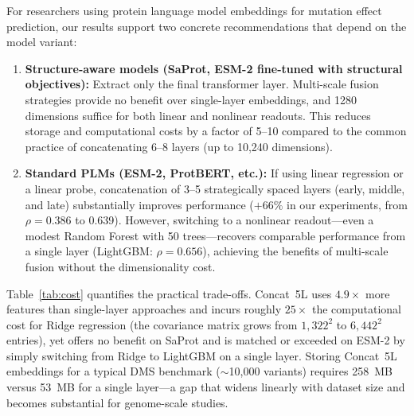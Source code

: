\documentclass[11pt,a4paper]{article}
\begin{document}
For researchers using protein language model embeddings for mutation effect
prediction, our results support two concrete recommendations that depend on
the model variant:

\begin{enumerate}
    \item \textbf{Structure-aware models (SaProt, ESM-2 fine-tuned with structural
    objectives):} Extract only the final transformer layer. Multi-scale fusion
    strategies provide no benefit over single-layer embeddings, and 1280
    dimensions suffice for both linear and nonlinear readouts. This reduces
    storage and computational costs by a factor of 5--10 compared to the common
    practice of concatenating 6--8 layers (up to 10,240 dimensions).

    \item \textbf{Standard PLMs (ESM-2, ProtBERT, etc.):} If using linear
    regression or a linear probe, concatenation of 3--5 strategically spaced
    layers (early, middle, and late) substantially improves performance
    ($+66\%$ in our experiments, from $\rho = 0.386$ to 0.639). However,
    switching to a nonlinear readout---even a modest Random Forest with 50
    trees---recovers comparable performance from a single layer (LightGBM:
    $\rho = 0.656$), achieving the benefits of multi-scale fusion without the
    dimensionality cost.
\end{enumerate}

Table~\ref{tab:cost} quantifies the practical trade-offs. Concat~5L uses
$4.9\times$ more features than single-layer approaches and incurs roughly
$25\times$ the computational cost for Ridge regression (the covariance matrix
grows from $1{,}322^2$ to $6{,}442^2$ entries), yet offers no benefit on
SaProt and is matched or exceeded on ESM-2 by simply switching from Ridge to
LightGBM on a single layer. Storing Concat~5L embeddings for a typical DMS
benchmark ($\sim$10,000 variants) requires 258~MB versus 53~MB for a single
layer---a gap that widens linearly with dataset size and becomes substantial
for genome-scale studies.
\end{document}
